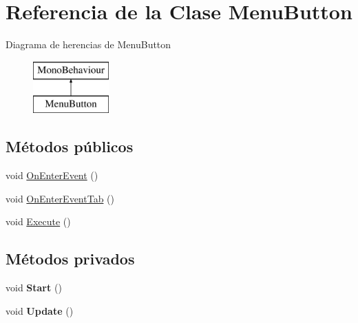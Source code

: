\hypertarget{class_menu_button}{}\section{Referencia de la Clase Menu\+Button}
\label{class_menu_button}
Diagrama de herencias de Menu\+Button\begin{figure}[H]
\begin{center}
\leavevmode
\includegraphics[height=2.000000cm]{class_menu_button}
\end{center}
\end{figure}
\subsection*{Métodos públicos}
\begin{DoxyCompactItemize}
\item 
void \mbox{\hyperlink{class_menu_button_ab023310f5a656d619dba3d006df55520}{On\+Enter\+Event}} ()
\item 
void \mbox{\hyperlink{class_menu_button_ab62a32b6f3e254a883de5bb7ad6007dc}{On\+Enter\+Event\+Tab}} ()
\item 
void \mbox{\hyperlink{class_menu_button_ad2cf1b797001328270ffbc6f001627e5}{Execute}} ()
\end{DoxyCompactItemize}
\subsection*{Métodos privados}
\begin{DoxyCompactItemize}
\item 
\mbox{\label{class_menu_button_a6f7a50039e0166b5c71c8c9bd1719aeb}} 
void {\bfseries Start} ()
\item 
\mbox{\label{class_menu_button_a28238191c143de2c3b917b00cdd7c292}} 
void {\bfseries Update} ()
\end{DoxyCompactItemize}
